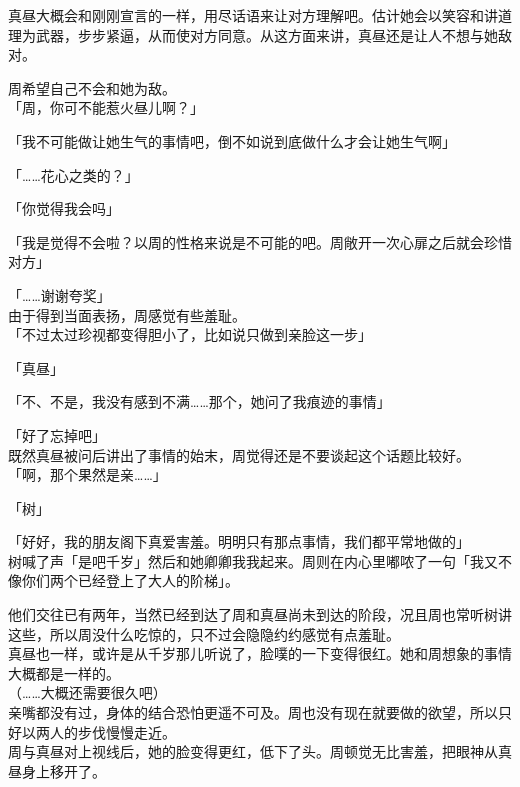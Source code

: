 真昼大概会和刚刚宣言的一样，用尽话语来让对方理解吧。估计她会以笑容和讲道理为武器，步步紧逼，从而使对方同意。从这方面来讲，真昼还是让人不想与她敌对。

周希望自己不会和她为敌。\\

「周，你可不能惹火昼儿啊？」

「我不可能做让她生气的事情吧，倒不如说到底做什么才会让她生气啊」

「……花心之类的？」

「你觉得我会吗」

「我是觉得不会啦？以周的性格来说是不可能的吧。周敞开一次心扉之后就会珍惜对方」

「……谢谢夸奖」\\

由于得到当面表扬，周感觉有些羞耻。\\

「不过太过珍视都变得胆小了，比如说只做到亲脸这一步」

「真昼」

「不、不是，我没有感到不满……那个，她问了我痕迹的事情」

「好了忘掉吧」\\

既然真昼被问后讲出了事情的始末，周觉得还是不要谈起这个话题比较好。\\

「啊，那个果然是亲……」

「树」

「好好，我的朋友阁下真爱害羞。明明只有那点事情，我们都平常地做的」\\

树喊了声「是吧千岁」然后和她卿卿我我起来。周则在内心里嘟哝了一句「我又不像你们两个已经登上了大人的阶梯」。

他们交往已有两年，当然已经到达了周和真昼尚未到达的阶段，况且周也常听树讲这些，所以周没什么吃惊的，只不过会隐隐约约感觉有点羞耻。\\

真昼也一样，或许是从千岁那儿听说了，脸噗的一下变得很红。她和周想象的事情大概都是一样的。\\

（……大概还需要很久吧）\\

亲嘴都没有过，身体的结合恐怕更遥不可及。周也没有现在就要做的欲望，所以只好以两人的步伐慢慢走近。\\

周与真昼对上视线后，她的脸变得更红，低下了头。周顿觉无比害羞，把眼神从真昼身上移开了。
